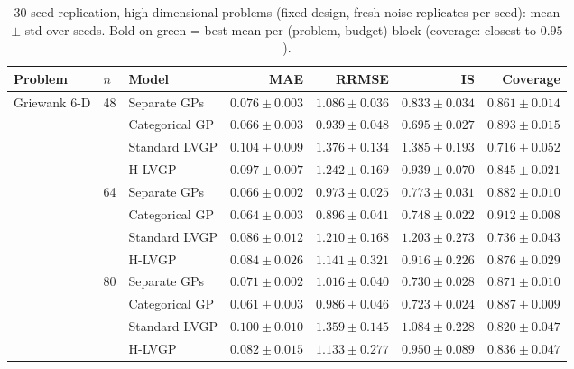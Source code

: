 \begin{table}[htbp]
\centering
\small
\setlength{\tabcolsep}{3pt}
\caption{30-seed replication, high-dimensional problems (fixed design, fresh noise replicates per seed): mean $\pm$ std over seeds. Bold on green = best mean per (problem, budget) block (coverage: closest to $0.95$).}
\label{tab:seeds_hd}
\begin{tabular}{lllrrrr}
\toprule
Problem & $n$ & Model & MAE & RRMSE & IS & Coverage \\
\midrule
\multirow{20}{*}{Griewank 6-D} & \multirow{4}{*}{48} & Separate GPs & $0.076 \pm 0.003$ & $1.086 \pm 0.036$ & $0.833 \pm 0.034$ & $0.861 \pm 0.014$ \\
 &  & Categorical GP & \colorbox{green!20}{\boldmath$0.066 \pm 0.003$} & \colorbox{green!20}{\boldmath$0.939 \pm 0.048$} & \colorbox{green!20}{\boldmath$0.695 \pm 0.027$} & \colorbox{green!20}{\boldmath$0.893 \pm 0.015$} \\
 &  & Standard LVGP & $0.104 \pm 0.009$ & $1.376 \pm 0.134$ & $1.385 \pm 0.193$ & $0.716 \pm 0.052$ \\
 &  & H-LVGP & $0.097 \pm 0.007$ & $1.242 \pm 0.169$ & $0.939 \pm 0.070$ & $0.845 \pm 0.021$ \\
\cmidrule(lr){2-7}
 & \multirow{4}{*}{64} & Separate GPs & $0.066 \pm 0.002$ & $0.973 \pm 0.025$ & $0.773 \pm 0.031$ & $0.882 \pm 0.010$ \\
 &  & Categorical GP & \colorbox{green!20}{\boldmath$0.064 \pm 0.003$} & \colorbox{green!20}{\boldmath$0.896 \pm 0.041$} & \colorbox{green!20}{\boldmath$0.748 \pm 0.022$} & \colorbox{green!20}{\boldmath$0.912 \pm 0.008$} \\
 &  & Standard LVGP & $0.086 \pm 0.012$ & $1.210 \pm 0.168$ & $1.203 \pm 0.273$ & $0.736 \pm 0.043$ \\
 &  & H-LVGP & $0.084 \pm 0.026$ & $1.141 \pm 0.321$ & $0.916 \pm 0.226$ & $0.876 \pm 0.029$ \\
\cmidrule(lr){2-7}
 & \multirow{4}{*}{80} & Separate GPs & $0.071 \pm 0.002$ & $1.016 \pm 0.040$ & $0.730 \pm 0.028$ & $0.871 \pm 0.010$ \\
 &  & Categorical GP & \colorbox{green!20}{\boldmath$0.061 \pm 0.003$} & \colorbox{green!20}{\boldmath$0.986 \pm 0.046$} & \colorbox{green!20}{\boldmath$0.723 \pm 0.024$} & \colorbox{green!20}{\boldmath$0.887 \pm 0.009$} \\
 &  & Standard LVGP & $0.100 \pm 0.010$ & $1.359 \pm 0.145$ & $1.084 \pm 0.228$ & $0.820 \pm 0.047$ \\
 &  & H-LVGP & $0.082 \pm 0.015$ & $1.133 \pm 0.277$ & $0.950 \pm 0.089$ & $0.836 \pm 0.047$ \\

\end{tabular}
\end{table}
